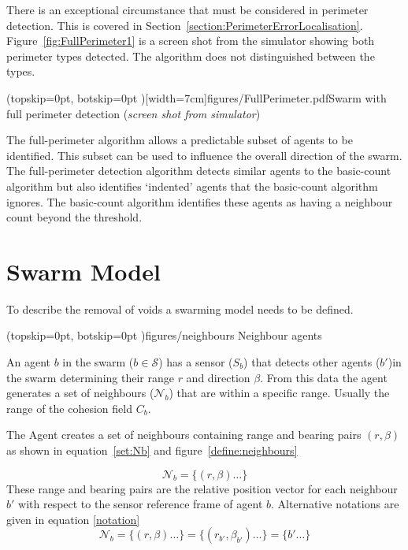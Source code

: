 \documentclass{ieeeaccess}
\begin{document}
There is an exceptional circumstance that must be considered in perimeter detection. This is covered in Section~\ref{section:PerimeterErrorLocalisation}. Figure~\ref{fig:FullPerimeter1} is a screen shot from the simulator showing both perimeter types detected. The algorithm does not distinguished between the types. 


\Figure[t!](topskip=0pt, botskip=0pt )[width=7cm]{figures/FullPerimeter.pdf}{Swarm with full perimeter detection (\textit{screen shot from simulator})\label{fig:FullPerimeter1}}

The full-perimeter algorithm allows a predictable subset of agents to be identified. This subset can be used to influence the overall direction of the swarm. The full-perimeter detection algorithm detects similar agents to the basic-count algorithm but also identifies `indented' agents that the basic-count algorithm ignores. The basic-count algorithm identifies these agents as having a neighbour count beyond the threshold.

\section{Swarm Model}\label{sec:Swarm Model}
To describe the removal of voids a swarming model needs to be defined.

\Figure[t!](topskip=0pt, botskip=0pt ){figures/neighbours} {Neighbour agents\label{define:neighbours}}

An agent $b$ in the swarm ($b\in\mathcal S$) has a sensor ($S_b$) that detects other agents
($b'$)in the swarm
determining their range $r$  and direction $\beta$.  From this data the agent generates a
set of neighbours ($\mathcal N_b$) that are within a specific range.  Usually the range of the
cohesion field $C_b$.

The Agent creates a set of neighbours containing range and bearing pairs
$(r,\beta)$ as shown in equation~\ref{set:Nb} and
figure~\ref{define:neighbours}

\begin{equation}
\mathcal N_b = \{ (r,\beta) \ldots \}
\label{set:Nb}
\end{equation}
These range and bearing pairs are the relative position vector for each
neighbour $b'$ with respect to the sensor reference frame of agent $b$.
Alternative notations are given in equation \ref{notation}
\begin{equation}
	\mathcal N_b = \{(r,\beta) \ldots \} = \{ (r_{b'}, \beta_{b'}) \ldots \} = \{
	b' \ldots \}
	\label{notation}
\end{equation}
\end{document}
